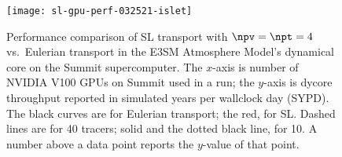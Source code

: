 \begin{figure}[tbh]
  \centering
  \texttt{[image: sl-gpu-perf-032521-islet]}
  \caption{
    Performance comparison of SL transport with $\npv=\npt=4$ vs.~Eulerian transport
    in the E3SM Atmosphere Model's dynamical core on the Summit supercomputer.
    The $x$-axis is number of NVIDIA V100 GPUs on Summit used in a run;
    the $y$-axis is dycore throughput reported in simulated years per wallclock day (SYPD).
    The black curves are for Eulerian transport; the red, for SL.
    Dashed lines are for 40 tracers; solid and the dotted black line, for 10.
    A number above a data point reports the $y$-value of that point.
  }
  \label{fig:summit-perf}
\end{figure}
